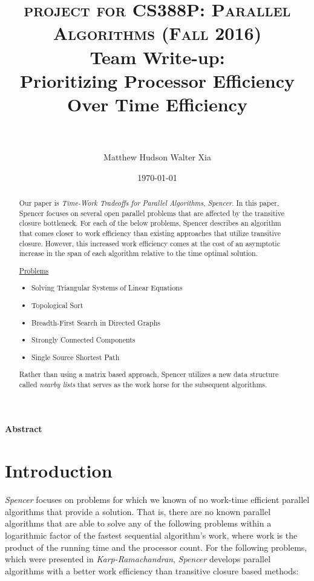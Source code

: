 \documentclass[paper=a4, fontsize=11pt]{scrartcl} %
\title{	
\normalfont \normalsize 
\textsc{project for CS388P: Parallel Algorithms (Fall 2016)} 
\horrule{0.5pt} \\[0.4cm] %
\huge Team Write-up:\\ Prioritizing Processor Efficiency Over Time Efficiency \\ %
\horrule{2pt} \\[0.5cm] %
}
\author{Matthew Hudson \hspace{5mm} Walter Xia }	%
\date{\normalsize\today} %
\numberwithin{equation}{section} %
\numberwithin{figure}{section} %
\numberwithin{table}{section} %
\begin{document}
\maketitle %

\justify
\textbf{Abstract}

\begin{abstract}
Our paper is \textit{Time-Work Tradeoffs for Parallel Algorithms}, \textit{Spencer\cite{S97}}. In this paper, Spencer focuses on several open parallel problems that are affected by the transitive closure bottleneck. For each of the below problems, Spencer describes an algorithm that comes closer to work efficiency than existing approaches that utilize transitive closure. However, this increased work efficiency comes at the cost of an asymptotic increase in the span of each algorithm relative to the time optimal solution.  

\underline{Problems}
\begin{itemize}
\item Solving Triangular Systems of Linear Equations
\item Topological Sort
\item Breadth-First Search in Directed Graphs
\item Strongly Connected Components
\item Single Source Shortest Path
\end{itemize}

Rather than using a matrix based approach, Spencer utilizes a new data structure called \textit{nearby lists} that serves as the work horse for the subsequent algorithms. \\
\end{abstract}


\section{Introduction}

\textit{Spencer\cite{S97}} focuses on problems for which we known of no work-time efficient parallel algorithms that provide a solution. That is, there are no known parallel algorithms that are able to solve any of the following problems within a logarithmic factor of the fastest sequential algorithm's work, where work is the product of the running time and the processor count. For the following problems, which were presented in \textit{Karp-Ramachandran\cite{KR90}}, \textit{Spencer\cite{S97}} develops parallel algorithms with a better work efficiency than transitive closure based methods: 
\end{document}
